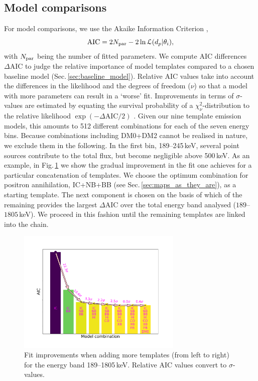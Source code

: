 \documentclass[doublespace,nopageskip]{VTthesis} %
\begin{document}
\subsection{Model comparisons}\label{sec:model_comparisons}\label{sec:model_combinations}
%
For model comparisons, we use the Akaike Information Criterion \citep[AIC;][]{Akaike1974_AIC,Burnham2004_AICBIC},
%
\begin{equation}
	\mathrm{AIC} = 2 N_{\rm par} - 2 \ln\mathcal{L}(d_p|\theta_i)\mathrm{,}
	\label{eq:AICc}
\end{equation}
%
\noindent with $N_{\rm par}$ being the number of fitted parameters.
%
We compute AIC differences $\Delta\mathrm{AIC}$ to judge the relative importance of model templates compared to a chosen baseline model (Sec.\,\ref{sec:baseline_model}).
%
Relative AIC values take into account the differences in the likelihood and the degrees of freedom ($\nu$) so that a model with more parameters can result in a `worse' fit.
%
Improvements in terms of $\sigma$-values are estimated by equating the survival probability of a $\chi^2_{\nu}$-distribution to the relative likelihood $\exp\left(-\Delta\mathrm{AIC}/2\right)$ \citep{Burnham2004_AICBIC}.
%
Given our nine template emission models, this amounts to 512 different combinations for each of the seven energy bins.
%
Because combinations including DM0+DM2 cannot be realised in nature, we exclude them in the following.
%
In the first bin, 189--245\,keV, several point sources contribute to the total flux, but become negligible above 500\,keV.	
%
As an example, in Fig.\,\ref{fig:model_improvement_all_models} we show the 
gradual improvement in the fit one achieves for a particular concatenation of templates.
%
We choose the optimum combination for positron annihilation, IC+NB+BB (see Sec.\,\ref{sec:maps_as_they_are}), as a starting template.
%
The next component is chosen on the basis of which of the remaining provides the largest $\Delta\mathrm{AIC}$ over the total energy band analysed ($189$--$1805$\,keV).
%
We proceed in this fashion until the remaining templates are linked into the chain.

\begin{figure}[htb]
	\centering
	\includegraphics[width=0.7\textwidth,trim=0.10in 0.7in 0.94in 0.83in,clip=true]{Figures/511keV/bar_plot_aic_spec_new2.pdf}%
	\caption{Fit improvements when adding more templates (from left to right) for the energy band 189--1805\,keV. Relative AIC values convert to $\sigma$-values.}
	\label{fig:model_improvement_all_models}%
\end{figure}
\end{document}
